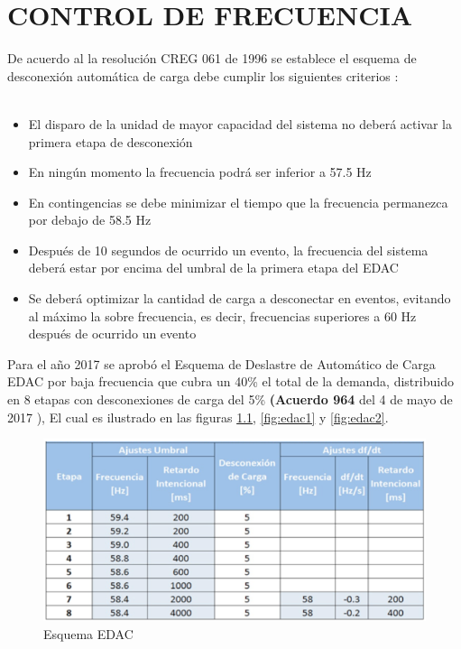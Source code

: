 \documentclass[a5paper]{book}%
\begin{document}
  


\chapter{CONTROL DE FRECUENCIA}

De acuerdo al la resolución CREG 061 de 1996 se establece el esquema de desconexión automática de carga debe cumplir los siguientes criterios \cite{CREG0611996}:\\\\

\begin{itemize}
\item El disparo de la unidad de mayor capacidad del sistema no deberá activar la primera etapa de
desconexión
\item En ningún momento la frecuencia podrá ser inferior a 57.5 Hz
\item En contingencias se debe minimizar el tiempo que la frecuencia permanezca por debajo de 58.5 Hz
\item Después de 10 segundos de ocurrido un evento, la frecuencia del sistema deberá estar por encima
del umbral de la primera etapa del EDAC
\item Se deberá optimizar la cantidad de carga a desconectar en eventos, evitando al máximo la sobre
frecuencia, es decir, frecuencias superiores a 60 Hz después de ocurrido un evento
\end{itemize}

Para el año 2017 se aprobó el Esquema de Deslastre de Automático de
Carga EDAC por baja frecuencia que cubra un 40\% el total de la
demanda, distribuido en 8 etapas con desconexiones de carga del 5\%
\textbf{(Acuerdo 964} del 4 de mayo de 2017 ), El cual es ilustrado en
las figuras \ref{fig:edac}, \ref{fig:edac1} y \ref{fig:edac2}.

\begin{figure}[H]
  \centering
  \caption{Esquema EDAC}
  \label{fig:edac}
  \includegraphics[width=0.8\linewidth]{esquema_edac}
\end{figure}
\end{document}
